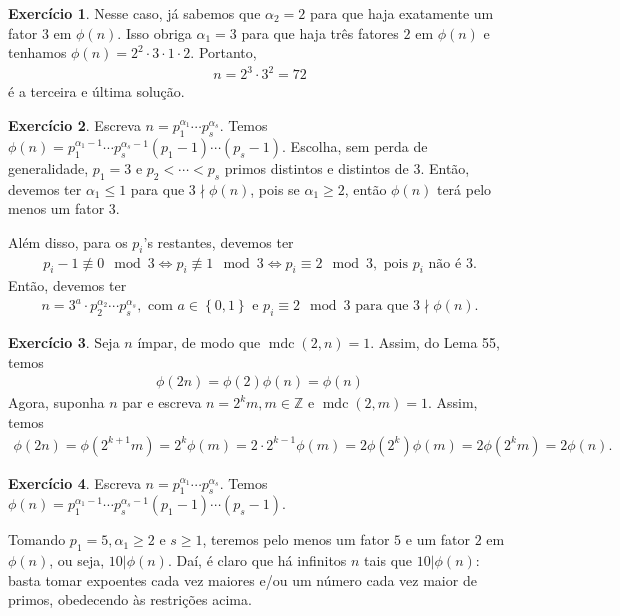 \documentclass[a4paper,12pt]{article}
\DeclareMathOperator{\mdc}{mdc}
\theoremstyle{definition}
\newtheorem{exercise}{Exercício}%
\begin{document}
\begin{exercise}
	\par\vspace{0.3cm} Nesse caso, já sabemos que $\alpha_2 = 2$ para que haja exatamente um fator $3$ em $\phi(n)$. Isso obriga $\alpha_1 = 3$ para que haja três fatores $2$ em $\phi(n)$ e tenhamos $\phi(n) = 2^2\cdot 3\cdot 1\cdot 2$. Portanto, 
	\begin{align*}
	n = 2^3\cdot 3^2 = 72
	\end{align*}
	é a terceira e última solução.
	\end{exercise}
	\begin{exercise}
		Escreva $n = p_1^{\alpha_1}\cdots p_s^{\alpha_s}$. Temos $\phi(n) = p_1^{\alpha_1 - 1}\cdots p_s^{\alpha_s - 1}(p_1 - 1)\cdots (p_s - 1)$. Escolha, sem perda de generalidade, $p_1 = 3$ e $p_2 < \cdots < p_s$ primos distintos e distintos de $3$. Então, devemos ter $\alpha_1\leq 1$ para que $3\nmid\phi(n)$, pois se $\alpha_1\geq 2$, então $\phi(n)$ terá pelo menos um fator $3$.
		\par\vspace{0.3cm} Além disso, para os $p_i$'s restantes, devemos ter
		\begin{align*}
		p_i - 1\not\equiv 0\mod 3 \Leftrightarrow p_i\not\equiv 1\mod 3 \Leftrightarrow p_i \equiv 2\mod 3, \text{ pois } p_i \text{ não é } 3.
		\end{align*}
		Então, devemos ter 
		\begin{align*}
		n = 3^a\cdot p_2^{\alpha_2}\cdots p_s^{\alpha_s}, \text{ com } a\in\left\{ 0,1 \right\} \text{ e } p_i\equiv 2\mod 3 \text{ para que } 3\nmid \phi(n).
		\end{align*}
	\end{exercise}
	\begin{exercise}
		Seja $n$ ímpar, de modo que $\mdc(2,n) = 1$. Assim, do Lema 55, temos
		\begin{align*}
		\phi(2n) = \phi(2)\phi(n) = \phi(n)
		\end{align*}
		Agora, suponha $n$ par e escreva $n = 2^km, m\in\mathbb{Z}$ e $\mdc(2,m) = 1$. Assim, temos
		\begin{align*}
		\phi(2n) = \phi(2^{k+1}m) = 2^k\phi(m) = 2\cdot 2^{k-1}\phi(m) = 2\phi(2^k)\phi(m) = 2\phi(2^km) = 2\phi(n).
		\end{align*}
	\end{exercise}
	\begin{exercise}
		Escreva $n = p_1^{\alpha_1}\cdots p_s^{\alpha_s}$. Temos $\phi(n) = p_1^{\alpha_1 - 1}\cdots p_s^{\alpha_s - 1}(p_1 - 1)\cdots (p_s - 1)$. 
		\par\vspace{0.3cm} Tomando $p_1 = 5, \alpha_1\geq 2$ e $s\geq 1$, teremos pelo menos um fator $5$ e um fator $2$ em $\phi(n)$, ou seja, $10|\phi(n)$. Daí, é claro que há infinitos $n$ tais que $10|\phi(n)$: basta tomar expoentes cada vez maiores e/ou um número cada vez maior de primos, obedecendo às restrições acima.
	\end{exercise}
\end{document}
